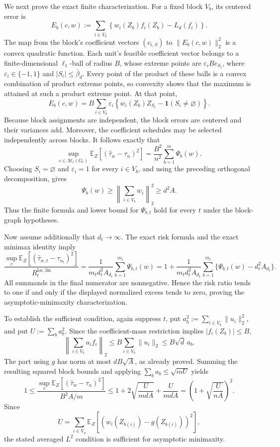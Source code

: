 We next prove the exact finite characterization. For a fixed block \(V_b\), its centered error is
\[
E_b(c,w):=\sum_{i\in V_b}\left\{w_i(Z_b)f_i(Z_b)-L_d(f_i)\right\}.
\]
The map from the block's coefficient vectors \((c_{i,S})\) to \(\|E_b(c,w)\|_2^2\) is a convex quadratic function. Each unit's feasible coefficient vector belongs to a finite-dimensional \(\ell_1\)-ball of radius \(B\), whose extreme points are \(\varepsilon_iB e_{S_i}\), where \(\varepsilon_i\in\{-1,1\}\) and \(|S_i|\le\bar\beta_d\). Every point of the product of these balls is a convex combination of product extreme points, so convexity shows that the maximum is attained at such a product extreme point. At that point,
\[
E_b(c,w)=B\sum_{i\in V_b}\varepsilon_i
\left\{w_i(Z_b)Z_{S_i}-\mathbf1(S_i\ne\varnothing)\right\}.
\]
Because block assignments are independent, the block errors are centered and their variances add. Moreover, the coefficient schedules may be selected independently across blocks. It follows exactly that
\[
\sup_{c\in\mathcal M_t(G_t)}
\mathbb E_Z[(\widehat\tau_w-\tau_n)^2]
=\frac{B^2}{n^2}\sum_{b=1}^m\Psi_b(w).
\]
Choosing \(S_i=\varnothing\) and \(\varepsilon_i=1\) for every \(i\in V_b\), and using the preceding orthogonal decomposition, gives
\[
\Psi_b(w)\ge\left\|\sum_{i\in V_b}w_i\right\|_2^2\ge d^2A.
\]
Thus the finite formula and lower bound for \(\Psi_{b,t}\) hold for every \(t\) under the block-graph hypotheses.

Now assume additionally that \(d_t\to\infty\). The exact risk formula and the exact minimax identity imply
\[
\frac{\sup_c\mathbb E_Z[(\widehat\tau_{w,t}-\tau_{n_t})^2]}
{R_t^{\mathrm{loc,lin}}}
=\frac{1}{m_td_t^2A_{d_t}}\sum_{b=1}^{m_t}\Psi_{b,t}(w)
=1+\frac{1}{m_td_t^2A_{d_t}}
\sum_{b=1}^{m_t}\{\Psi_{b,t}(w)-d_t^2A_{d_t}\}.
\]
All summands in the final numerator are nonnegative. Hence the risk ratio tends to one if and only if the displayed normalized excess tends to zero, proving the asymptotic-minimaxity characterization.

To establish the sufficient condition, again suppress \(t\), put \(a_b^2:=\sum_{i\in V_b}\|u_i\|_2^2\), and put \(U:=\sum_ba_b^2\). Since the coefficient-mass restriction implies \(|f_i(Z_b)|\le B\),
\[
\left\|\sum_{i\in V_b}u_i f_i\right\|_2
\le B\sum_{i\in V_b}\|u_i\|_2
\le B\sqrt d\,a_b.
\]
The part using \(g\) has norm at most \(dB\sqrt A\), as already proved. Summing the resulting squared block bounds and applying \(\sum_ba_b\le\sqrt{mU}\) yields
\[
1\le
\frac{\sup_c\mathbb E_Z[(\widehat\tau_w-\tau_n)^2]}{B^2A/m}
\le1+2\sqrt{\frac{U}{mdA}}+\frac{U}{mdA}
=\left(1+\sqrt{\frac{U}{nA}}\right)^2.
\]
Since
\[
U=\sum_{i\in V_n}\mathbb E_Z[(w_i(Z_{b(i)})-g(Z_{b(i)}))^2],
\]
the stated averaged \(L^2\) condition is sufficient for asymptotic minimaxity.

